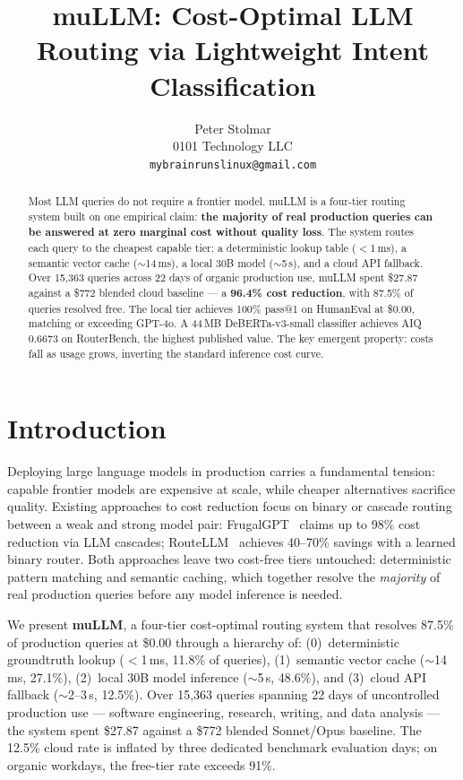 \documentclass[11pt]{article}
\title{muLLM: Cost-Optimal LLM Routing via Lightweight Intent Classification}
\author{Peter Stolmar\\
0101 Technology LLC\\
\texttt{mybrainrunslinux@gmail.com}}
\begin{document}
\maketitle

\begin{abstract}
Most LLM queries do not require a frontier model. muLLM is a four-tier
routing system built on one empirical claim: \textbf{the majority of
real production queries can be answered at zero marginal cost without
quality loss}. The system routes each query to the cheapest capable
tier: a deterministic lookup table ($<$1\,ms), a semantic vector cache
($\sim$14\,ms), a local 30B model ($\sim$5\,s), and a cloud API
fallback. Over 15,363 queries across 22 days of organic production use,
muLLM spent \$27.87 against a \$772 blended cloud baseline --- a
\textbf{96.4\% cost reduction}, with 87.5\% of queries resolved free.
The local tier achieves 100\% pass@1 on HumanEval at \$0.00, matching
or exceeding GPT-4o. A 44\,MB DeBERTa-v3-small classifier achieves AIQ
0.6673 on RouterBench, the highest published value. The key emergent
property: costs fall as usage grows, inverting the standard inference
cost curve.
\end{abstract}

\section{Introduction}

Deploying large language models in production carries a fundamental
tension: capable frontier models are expensive at scale, while cheaper
alternatives sacrifice quality. Existing approaches to cost reduction
focus on binary or cascade routing between a weak and strong model
pair: FrugalGPT~\cite{chen2023frugalgpt} claims up to 98\% cost
reduction via LLM cascades; RouteLLM~\cite{ong2024routellm} achieves
40--70\% savings with a learned binary router. Both approaches leave two
cost-free tiers untouched: deterministic pattern matching and semantic
caching, which together resolve the \textit{majority} of real
production queries before any model inference is needed.

We present \textbf{muLLM}, a four-tier cost-optimal routing system that
resolves 87.5\% of production queries at \$0.00 through a hierarchy of:
(0)~deterministic groundtruth lookup ($<$1\,ms, 11.8\% of queries),
(1)~semantic vector cache ($\sim$14\,ms, 27.1\%), (2)~local 30B model
inference ($\sim$5\,s, 48.6\%), and (3)~cloud API fallback ($\sim$2--3\,s,
12.5\%). Over 15,363 queries spanning 22 days of uncontrolled
production use --- software engineering, research, writing, and data
analysis --- the system spent \$27.87 against a \$772 blended
Sonnet/Opus baseline. The 12.5\% cloud rate is inflated by three
dedicated benchmark evaluation days; on organic workdays, the
free-tier rate exceeds 91\%.
\end{document}
